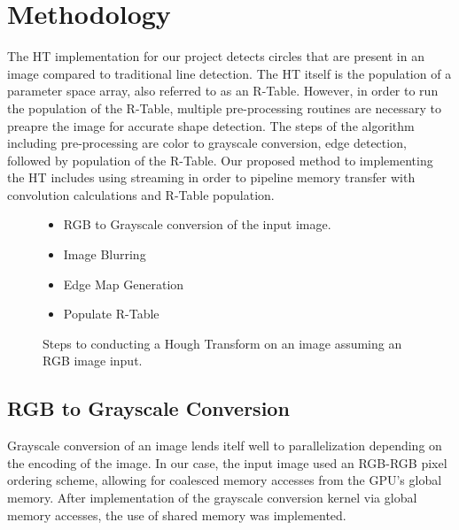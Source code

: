 \documentclass[conference]{IEEEtran}
\begin{document}
\section{Methodology}
The HT implementation for our project detects circles that are present in an image compared to traditional line detection.
The HT itself is the population of a parameter space array, also referred to as an R-Table.
However, in order to run the population of the R-Table, multiple pre-processing routines are necessary to preapre the image for accurate shape detection.
The steps of the algorithm including pre-processing are color to grayscale conversion, edge detection, followed by population of the R-Table.
Our proposed method to implementing the HT includes using streaming in order to pipeline memory transfer with convolution calculations and R-Table population.



\begin{figure}[h]
  \begin{itemize}
    \item RGB to Grayscale conversion of the input image.
    \item Image Blurring 
    \item Edge Map Generation
    \item Populate R-Table
  \end{itemize}\caption{Steps to conducting a Hough Transform on an image assuming an RGB image input.}\label{figure:hough-transform-steps}
\end{figure}



\subsection{RGB to Grayscale Conversion}
Grayscale conversion of an image lends itelf well to parallelization depending on the encoding of the image.
In our case, the input image used an RGB-RGB pixel ordering scheme, allowing for coalesced memory accesses from the GPU's global memory.
After implementation of the grayscale conversion kernel via global memory accesses, the use of shared memory was implemented.
\end{document}
